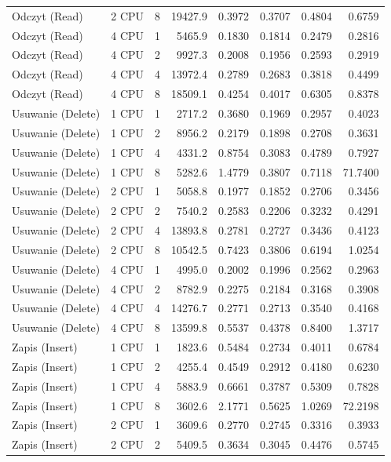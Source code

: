\begin{table}[ht]
{\begin{tabular}{llcrrrrr}
Odczyt (Read) & 2 CPU & 8 & 19427.9 & 0.3972 & 0.3707 & 0.4804 & 0.6759 \\
Odczyt (Read) & 4 CPU & 1 & 5465.9 & 0.1830 & 0.1814 & 0.2479 & 0.2816 \\
Odczyt (Read) & 4 CPU & 2 & 9927.3 & 0.2008 & 0.1956 & 0.2593 & 0.2919 \\
Odczyt (Read) & 4 CPU & 4 & 13972.4 & 0.2789 & 0.2683 & 0.3818 & 0.4499 \\
Odczyt (Read) & 4 CPU & 8 & 18509.1 & 0.4254 & 0.4017 & 0.6305 & 0.8378 \\
Usuwanie (Delete) & 1 CPU & 1 & 2717.2 & 0.3680 & 0.1969 & 0.2957 & 0.4023 \\
Usuwanie (Delete) & 1 CPU & 2 & 8956.2 & 0.2179 & 0.1898 & 0.2708 & 0.3631 \\
Usuwanie (Delete) & 1 CPU & 4 & 4331.2 & 0.8754 & 0.3083 & 0.4789 & 0.7927 \\
Usuwanie (Delete) & 1 CPU & 8 & 5282.6 & 1.4779 & 0.3807 & 0.7118 & 71.7400 \\
Usuwanie (Delete) & 2 CPU & 1 & 5058.8 & 0.1977 & 0.1852 & 0.2706 & 0.3456 \\
Usuwanie (Delete) & 2 CPU & 2 & 7540.2 & 0.2583 & 0.2206 & 0.3232 & 0.4291 \\
Usuwanie (Delete) & 2 CPU & 4 & 13893.8 & 0.2781 & 0.2727 & 0.3436 & 0.4123 \\
Usuwanie (Delete) & 2 CPU & 8 & 10542.5 & 0.7423 & 0.3806 & 0.6194 & 1.0254 \\
Usuwanie (Delete) & 4 CPU & 1 & 4995.0 & 0.2002 & 0.1996 & 0.2562 & 0.2963 \\
Usuwanie (Delete) & 4 CPU & 2 & 8782.9 & 0.2275 & 0.2184 & 0.3168 & 0.3908 \\
Usuwanie (Delete) & 4 CPU & 4 & 14276.7 & 0.2771 & 0.2713 & 0.3540 & 0.4168 \\
Usuwanie (Delete) & 4 CPU & 8 & 13599.8 & 0.5537 & 0.4378 & 0.8400 & 1.3717 \\
Zapis (Insert) & 1 CPU & 1 & 1823.6 & 0.5484 & 0.2734 & 0.4011 & 0.6784 \\
Zapis (Insert) & 1 CPU & 2 & 4255.4 & 0.4549 & 0.2912 & 0.4180 & 0.6230 \\
Zapis (Insert) & 1 CPU & 4 & 5883.9 & 0.6661 & 0.3787 & 0.5309 & 0.7828 \\
Zapis (Insert) & 1 CPU & 8 & 3602.6 & 2.1771 & 0.5625 & 1.0269 & 72.2198 \\
Zapis (Insert) & 2 CPU & 1 & 3609.6 & 0.2770 & 0.2745 & 0.3316 & 0.3933 \\
Zapis (Insert) & 2 CPU & 2 & 5409.5 & 0.3634 & 0.3045 & 0.4476 & 0.5745 \\

\end{tabular}}
\end{table}
